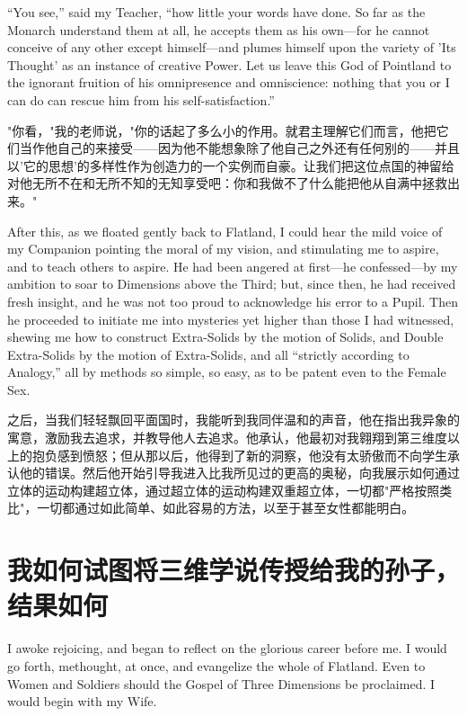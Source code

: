\documentclass[12pt,UTF8]{ctexbook}
\begin{document}
``You see,'' said my Teacher, ``how little your words have done. So far as the Monarch understand them at all, he accepts them as his own---for he cannot conceive of any other except himself---and plumes himself upon the variety of 'Its Thought' as an instance of creative Power. Let us leave this God of Pointland to the ignorant fruition of his omnipresence and omniscience: nothing that you or I can do can rescue him from his self-satisfaction.''

"你看，"我的老师说，"你的话起了多么小的作用。就君主理解它们而言，他把它们当作他自己的来接受——因为他不能想象除了他自己之外还有任何别的——并且以'它的思想'的多样性作为创造力的一个实例而自豪。让我们把这位点国的神留给对他无所不在和无所不知的无知享受吧：你和我做不了什么能把他从自满中拯救出来。"

After this, as we floated gently back to Flatland, I could hear the mild voice of my Companion pointing the moral of my vision, and stimulating me to aspire, and to teach others to aspire. He had been angered at first---he confessed---by my ambition to soar to Dimensions above the Third; but, since then, he had received fresh insight, and he was not too proud to acknowledge his error to a Pupil. Then he proceeded to initiate me into mysteries yet higher than those I had witnessed, shewing me how to construct Extra-Solids by the motion of Solids, and Double Extra-Solids by the motion of Extra-Solids, and all ``strictly according to Analogy,'' all by methods so simple, so easy, as to be patent even to the Female Sex.

之后，当我们轻轻飘回平面国时，我能听到我同伴温和的声音，他在指出我异象的寓意，激励我去追求，并教导他人去追求。他承认，他最初对我翱翔到第三维度以上的抱负感到愤怒；但从那以后，他得到了新的洞察，他没有太骄傲而不向学生承认他的错误。然后他开始引导我进入比我所见过的更高的奥秘，向我展示如何通过立体的运动构建超立体，通过超立体的运动构建双重超立体，一切都"严格按照类比"，一切都通过如此简单、如此容易的方法，以至于甚至女性都能明白。

\chapter{我如何试图将三维学说传授给我的孙子，结果如何}

I awoke rejoicing, and began to reflect on the glorious career before me. I would go forth, methought, at once, and evangelize the whole of Flatland. Even to Women and Soldiers should the Gospel of Three Dimensions be proclaimed. I would begin with my Wife.
\end{document}
